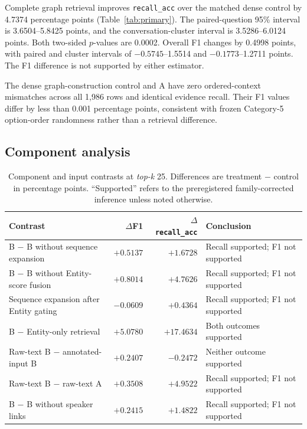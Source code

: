 \documentclass[10pt,twocolumn]{article}
\newcommand{\recallacc}{\texttt{recall\_acc}}
\newcommand{\topk}{\textit{top-k}}
\begin{document}
Complete graph retrieval improves \recallacc{} over the matched dense control
by 4.7374 percentage points (Table~\ref{tab:primary}). The paired-question
95\% interval is 3.6504--5.8425 points, and the conversation-cluster interval
is 3.5286--6.0124 points. Both two-sided \(p\)-values are 0.0002. Overall F1
changes by 0.4998 points, with paired and cluster intervals of
\(-0.5745\)--1.5514 and \(-0.1773\)--1.2711 points. The F1 difference is not
supported by either estimator.

The dense graph-construction control and A have zero ordered-context
mismatches across all 1,986 rows and identical evidence recall. Their F1
values differ by less than 0.001 percentage points, consistent with frozen
Category-5 option-order randomness rather than a retrieval difference.

\subsection{Component analysis}

\begin{table}[t]
\centering
\caption{Component and input contrasts at \topk{} 25. Differences are
treatment $-$ control in percentage points. ``Supported'' refers to the
preregistered family-corrected inference unless noted otherwise.}
\label{tab:components}
\begin{tabularx}{\textwidth}{@{}Xrrl@{}}
\toprule
Contrast & \(\Delta\)F1 & \(\Delta\)\recallacc{} & Conclusion \\
\midrule
B $-$ B without sequence expansion & \(+0.5137\) & \(+1.6728\) & Recall supported; F1 not supported \\
B $-$ B without Entity-score fusion & \(+0.8014\) & \(+4.7626\) & Recall supported; F1 not supported \\
Sequence expansion after Entity gating & \(-0.0609\) & \(+0.4364\) & Recall supported; F1 not supported \\
B $-$ Entity-only retrieval & \(+5.0780\) & \(+17.4634\) & Both outcomes supported \\
Raw-text B $-$ annotated-input B & \(+0.2407\) & \(-0.2472\) & Neither outcome supported \\
Raw-text B $-$ raw-text A & \(+0.3508\) & \(+4.9522\) & Recall supported; F1 not supported \\
B $-$ B without speaker links & \(+0.2415\) & \(+1.4822\) & Recall supported; F1 not supported \\
\bottomrule
\end{tabularx}
\end{table}
\end{document}

